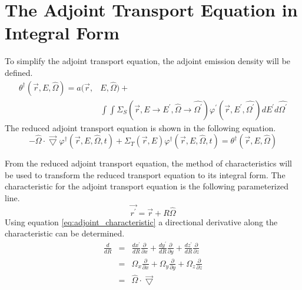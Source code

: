 \section{The Adjoint Transport Equation in Integral Form}
To simplify the adjoint transport equation, the adjoint emission density will 
be defined.
\begin{equation}
  \begin{split}
    \theta^{\dagger}(\vec{r},E,\hat{\Omega}) = a(\vec{r},&E,\hat{\Omega}) + \\
    & \int\int \Sigma_S(\vec{r},E \to E^{'},\hat{\Omega} \to \hat{\Omega^{'}})
    \varphi^{'}(\vec{r},E^{'},\hat{\Omega^{'}}) dE^{'}d\hat{\Omega^{'}}
  \end{split}
  \label{eq:adjoint_emission_density}
\end{equation}
The reduced adjoint transport equation is shown in the following equation.
\begin{equation}
  -\hat{\Omega} \cdot \vec{\bigtriangledown} 
    \varphi^{\dagger}(\vec{r},E,\hat{\Omega},t)
    + \Sigma_T(\vec{r},E) \varphi^{\dagger}(\vec{r},E,\hat{\Omega},t) =
    \theta^{\dagger}(\vec{r},E,\hat{\Omega})
\end{equation}
  
From the reduced adjoint transport equation, the method of characteristics will
be used to transform the reduced transport equation to its integral form. The
characteristic for the adjoint transport equation is the following 
parameterized line.
\begin{equation}
  \vec{r^{'}} = \vec{r} + R\hat{\Omega}
  \label{eq:adjoint_characteristic}
\end{equation}
Using equation \ref{eq:adjoint_characteristic} a directional derivative along
the characteristic can be determined.
\begin{eqnarray}
  \frac{d}{dR} & = & \frac{dx^{'}}{dR}\frac{\partial}{\partial x} +
  \frac{dy^{'}}{dR}\frac{\partial}{\partial y} +
  \frac{dz^{'}}{dR}\frac{\partial}{\partial z} \nonumber \\
  & = & \Omega_x \frac{\partial}{\partial x} +
  \Omega_y \frac{\partial}{\partial y} +
  \Omega_z \frac{\partial}{\partial z} \nonumber \\
  & = & \hat{\Omega} \cdot \vec{\bigtriangledown}
\end{eqnarray}

